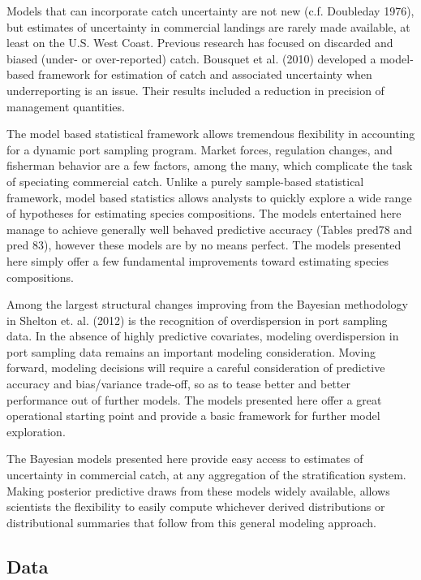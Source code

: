 \documentclass[12pt]{article}
\begin{document}
Models that can incorporate catch uncertainty are not new (c.f.
Doubleday 1976), but estimates of uncertainty in commercial landings are
rarely made available, at least on the U.S. West Coast. Previous
research has focused on discarded and biased (under- or over-reported)
catch. Bousquet et al. (2010) developed a model-based framework for
estimation of catch and associated uncertainty when underreporting is an
issue. Their results included a reduction in precision of management
quantities.

The model based statistical framework allows tremendous flexibility in
accounting for a dynamic port sampling program. Market forces,
regulation changes, and fisherman behavior are a few factors, among the
many, which complicate the task of speciating commercial catch. Unlike a
purely sample-based statistical framework, model based statistics allows
analysts to quickly explore a wide range of hypotheses for estimating
species compositions. The models entertained here manage to achieve
generally well behaved predictive accuracy (Tables pred78 and pred 83),
however these models are by no means perfect. The models presented here
simply offer a few fundamental improvements toward estimating species
compositions.

Among the largest structural changes improving from the Bayesian
methodology in Shelton et. al. (2012) is the recognition of
overdispersion in port sampling data. In the absence of highly
predictive covariates, modeling overdispersion in port sampling data
remains an important modeling consideration. Moving forward, modeling
decisions will require a careful consideration of predictive accuracy
and bias/variance trade-off, so as to tease better and better
performance out of further models. The models presented here offer a
great operational starting point and provide a basic framework for
further model exploration.

The Bayesian models presented here provide easy access to estimates of
uncertainty in commercial catch, at any aggregation of the
stratification system. Making posterior predictive draws from these
models widely available, allows scientists the flexibility to easily
compute whichever derived distributions or distributional summaries that
follow from this general modeling approach.

\subsection{Data}\label{data-1}
\end{document}

